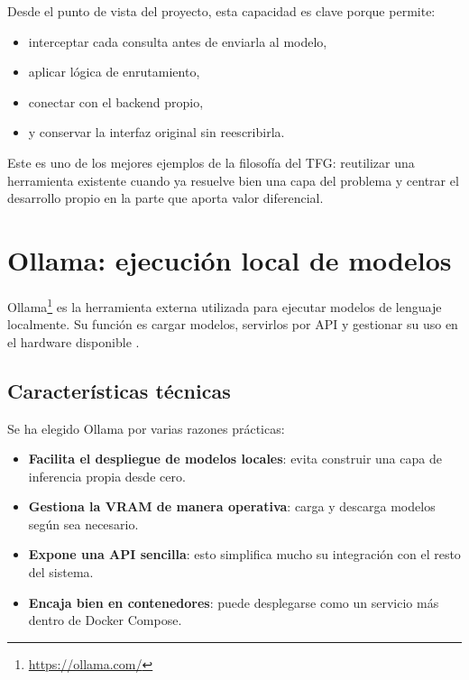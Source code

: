 Desde el punto de vista del proyecto, esta capacidad es clave porque permite:

\begin{itemize}
    \item interceptar cada consulta antes de enviarla al modelo,
    \item aplicar lógica de enrutamiento,
    \item conectar con el backend propio,
    \item y conservar la interfaz original sin reescribirla.
\end{itemize}

Este es uno de los mejores ejemplos de la filosofía del TFG: reutilizar una herramienta existente cuando ya resuelve bien una capa del problema y centrar el desarrollo propio en la parte que aporta valor diferencial.

\section{Ollama: ejecución local de modelos}
\label{sec:ollama}

Ollama\footnote{\url{https://ollama.com/}} es la herramienta externa utilizada para ejecutar modelos de lenguaje localmente. Su función es cargar modelos, servirlos por API y gestionar su uso en el hardware disponible \cite{ollama2024docs}.

\subsection{Características técnicas}

Se ha elegido Ollama por varias razones prácticas:

\begin{itemize}
    \item \textbf{Facilita el despliegue de modelos locales}: evita construir una capa de inferencia propia desde cero.
    \item \textbf{Gestiona la VRAM de manera operativa}: carga y descarga modelos según sea necesario.
    \item \textbf{Expone una API sencilla}: esto simplifica mucho su integración con el resto del sistema.
    \item \textbf{Encaja bien en contenedores}: puede desplegarse como un servicio más dentro de Docker Compose.
\end{itemize}


